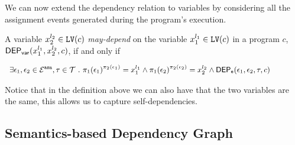 We can now extend the dependency relation to variables by considering all the assignment events generated during the program's execution. 
\begin{defn}
  \label{def:var_dep}
A variable ${x}_2^{l_2} \in \mathtt{LV}(c)$  \emph{may-depend} on the 
  variable ${x}_1^{l_1} \in \mathtt{LV}(c)$ in a program ${c}$,
  $\mathsf{DEP_{var}}({x}_1^{l_1}, {x}_2^{l_2}, {c})$, if and only if
\begin{center}
$
{\small   \begin{array}{l}
\exists \event_1, \event_2 \in \eventset^{\asn}, \trace \in \mathcal{T} \st
\pi_{1}{(\event_1)}^{\pi_{2}{(\event_1)}} = {x}_1^{l_1}
\land
\pi_{1}{(\event_2)}^{\pi_{2}{(\event_2)}} = {x}_2^{l_2}%
\land 
\eventdep(\event_1, \event_2, \trace, c) 
  \end{array}
}%
$
\end{center}
  \end{defn}
Notice that in the definition above we can also have that the two variables are the same, this allows us to capture self-dependencies.


\subsection{Semantics-based Dependency Graph}
\label{sec:design_choice}

